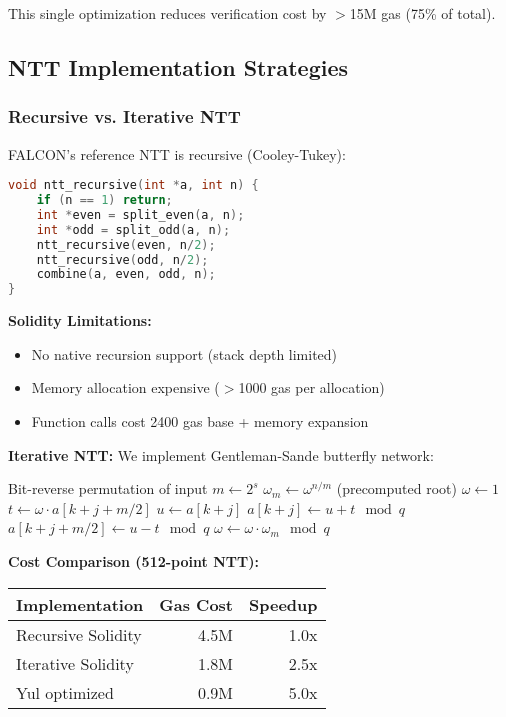 \documentclass[11pt,a4paper]{article}
\begin{document}
This single optimization reduces verification cost by $>$15M gas (75\% of total).

\subsection{NTT Implementation Strategies}

\subsubsection{Recursive vs. Iterative NTT}

FALCON's reference NTT is recursive (Cooley-Tukey):
\begin{lstlisting}[language=C]
void ntt_recursive(int *a, int n) {
    if (n == 1) return;
    int *even = split_even(a, n);
    int *odd = split_odd(a, n);
    ntt_recursive(even, n/2);
    ntt_recursive(odd, n/2);
    combine(a, even, odd, n);
}
\end{lstlisting}

\textbf{Solidity Limitations:}
\begin{itemize}
    \item No native recursion support (stack depth limited)
    \item Memory allocation expensive ($>$1000 gas per allocation)
    \item Function calls cost 2400 gas base + memory expansion
\end{itemize}

\textbf{Iterative NTT:} We implement Gentleman-Sande butterfly network:
\begin{algorithmic}[1]
\STATE Bit-reverse permutation of input
    \STATE $m \gets 2^s$
    \STATE $\omega_m \gets \omega^{n/m}$ (precomputed root)
        \STATE $\omega \gets 1$
            \STATE $t \gets \omega \cdot a[k+j+m/2]$
            \STATE $u \gets a[k+j]$
            \STATE $a[k+j] \gets u + t \mod q$
            \STATE $a[k+j+m/2] \gets u - t \mod q$
            \STATE $\omega \gets \omega \cdot \omega_m \mod q$
        \ENDFOR
    \ENDFOR
\ENDFOR
\end{algorithmic}

\textbf{Cost Comparison (512-point NTT):}
\begin{center}
\begin{tabular}{lrr}
\hline
\textbf{Implementation} & \textbf{Gas Cost} & \textbf{Speedup} \\
\hline
Recursive Solidity & 4.5M & 1.0x \\
Iterative Solidity & 1.8M & 2.5x \\
Yul optimized & 0.9M & 5.0x \\
\hline
\end{tabular}
\end{center}
\end{document}
